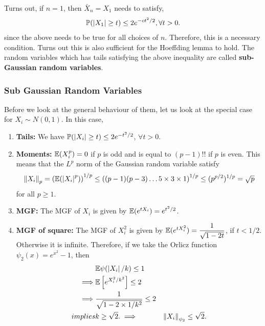 \documentclass[12pt]{article}
\begin{document}
Turns out, if $n = 1$, then $\bar{X}_n = X_1$ needs to satisfy,
\begin{equation*}
    \mathbb{P}(\left\lvert X_1 \right\rvert \geq t) \leq 2e^{-ct^2/2}, \forall t > 0.
\end{equation*}
\noindent since the above needs to be true for all choices of $n$. Therefore, this is a necessary condition. Turns out this is also sufficient for the Hoeffding lemma to hold. The random variables which has tails satisfying the above inequality are called \textbf{sub-Gaussian random variables}.


\subsubsection{Sub Gaussian Random Variables}

Before we look at the general behaviour of them, let us look at the special case for $X_i \sim N(0, 1)$. In this case,
\begin{enumerate}
    \item \textbf{Tails:} We have $\mathbb{P}(|X_i| \geq t) \leq 2e^{-t^2/2}$, $\forall t > 0$.
    \item \textbf{Moments:} $\mathbb{E}(X_i^p) = 0$ if $p$ is odd and is equal to $(p-1)!!$ if $p$ is even. This means that the $L^p$ norm of the Gaussian random variable satisfy
          \begin{equation*}
              \left\Vert X_i \right\Vert_p = \left( \mathbb{E}(\left\lvert X_i \right\rvert^p) \right)^{1/p} \leq \left( (p-1)(p-3)\dots 5\times 3 \times 1 \right)^{1/p} \leq (p^{p/2})^{1/p} = \sqrt{p}
          \end{equation*}
          \noindent for all $p \geq 1$.
    \item \textbf{MGF:} The MGF of $X_i$ is given by $\mathbb{E}(e^{tX_i}) = e^{t^2/2}$.
    \item \textbf{MGF of square:} The MGF of $X_i^2$ is given by $\mathbb{E}(e^{tX_i^2}) = \dfrac{1}{\sqrt{1-2t}}$, if $t < 1/2$. Otherwise it is infinite. Therefore, if we take the Orlicz function $\psi_2(x) = e^{x^2} -1$, then
          \begin{align*}
                       & \mathbb{E}\psi(\left\lvert X_i \right\rvert/k) \leq 1                  \\
              \implies & \mathbb{E}\left[ e^{X_i^2/k^2} \right] \leq 2       \\
              \implies & \dfrac{1}{\sqrt{1 - 2 \times 1/k^2}} \leq 2 \\
              implies  & k \geq \sqrt{2}.
              \implies & \left\Vert X_i \right\Vert_{\psi_2} \leq \sqrt{2}.
          \end{align*}
\end{enumerate}
\end{document}

